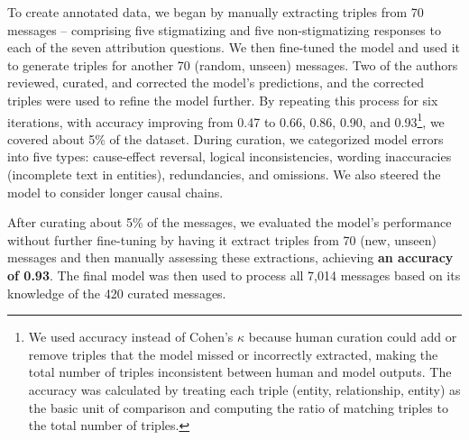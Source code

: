 To create annotated data, we began by manually extracting triples from 70 messages – comprising five stigmatizing and five non-stigmatizing responses to each of the seven attribution questions. 
We then fine-tuned the model and used it to generate triples for another 70 (random, unseen) messages. 
Two of the authors reviewed, curated, and corrected the model's predictions, and the corrected triples were used to refine the model further. 
By repeating this process for six iterations, with accuracy improving from 0.47 to 0.66, 0.86, 0.90, and 0.93\footnote{We used accuracy instead of Cohen's $\kappa$ because human curation could add or remove triples that the model missed or incorrectly extracted, making the total number of triples inconsistent between human and model outputs. The accuracy was calculated by treating each triple (entity, relationship, entity) as the basic unit of comparison and computing the ratio of matching triples to the total number of triples.}, we covered about 5\% of the dataset. 
During curation, we categorized model errors into five types: cause-effect reversal, logical inconsistencies, wording inaccuracies (incomplete text in entities), redundancies, and omissions. 
We also steered the model to consider longer causal chains.

After curating about 5\% of the messages, we evaluated the model's performance without further fine-tuning by having it extract triples from 70 (new, unseen) messages and then manually assessing these extractions, achieving \textbf{an accuracy of 0.93}.
The final model was then used to process all 7,014 messages based on its knowledge of the 420 curated messages.



